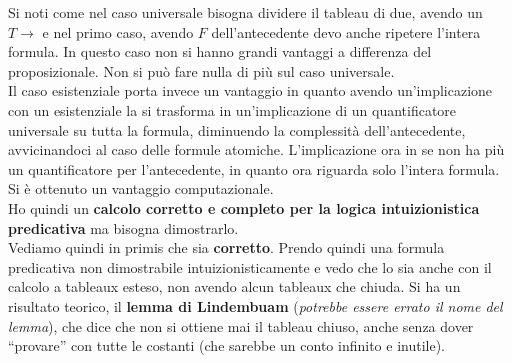 \documentclass[a4paper,12pt, oneside]{book}
\begin{document}
Si noti come nel caso universale bisogna dividere il tableau di due, avendo un
$T\to$ e nel primo caso, avendo $F$ dell'antecedente devo anche ripetere
l'intera formula. In questo caso non si hanno grandi vantaggi a differenza del
proposizionale. Non si può fare nulla di più sul caso universale.\\
Il caso esistenziale porta invece un vantaggio in quanto avendo un'implicazione
con un esistenziale la si trasforma in un'implicazione di un quantificatore
universale su tutta la formula, diminuendo la complessità dell'antecedente,
avvicinandoci al caso delle formule atomiche. L'implicazione ora in se non ha
più un quantificatore per l'antecedente, in quanto ora riguarda solo l'intera
formula. Si è ottenuto un vantaggio computazionale.\\
Ho quindi un \textbf{calcolo corretto e completo per la logica intuizionistica
  predicativa} ma bisogna dimostrarlo. \\
Vediamo quindi in primis che sia \textbf{corretto}. Prendo quindi una formula
predicativa non dimostrabile intuizionisticamente e vedo che lo sia anche con il
calcolo a tableaux esteso, non avendo alcun tableaux che chiuda. Si ha un
risultato teorico, il \textbf{lemma di Lindembuam} (\textit{potrebbe essere
  errato il nome del lemma}), che dice che non si ottiene mai il tableau
chiuso, anche senza dover ``provare'' con tutte le costanti (che sarebbe un
conto infinito e inutile).
\end{document}
